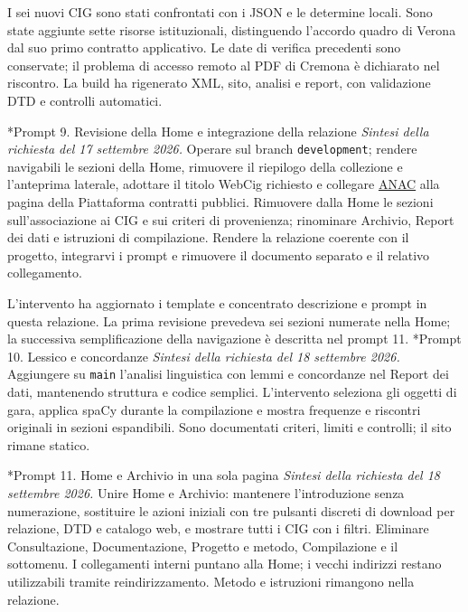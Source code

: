 \documentclass[10pt,a4paper]{article}
\makeatletter
\newcommand{\code}[1]{\texttt{#1}}
\newcommand{\anac}{\href{https://www.anticorruzione.it/-/piattaforma-contratti-pubblici}{ANAC}}
\renewcommand\subsection{\@startsection{subsection}{2}{0pt}{6pt}{2pt}{\normalsize\bfseries}}
\makeatother
\begin{document}
I sei nuovi CIG sono stati confrontati con i JSON e le determine locali. Sono state aggiunte sette risorse istituzionali, distinguendo l’accordo quadro di Verona dal suo primo contratto applicativo. Le date di verifica precedenti sono conservate; il problema di accesso remoto al PDF di Cremona è dichiarato nel riscontro. La build ha rigenerato XML, sito, analisi e report, con validazione DTD e controlli automatici.

\subsection*{Prompt 9. Revisione della Home e integrazione della relazione}
\emph{Sintesi della richiesta del 17 settembre 2026.} Operare sul branch \code{development}; rendere navigabili le sezioni della Home, rimuovere il riepilogo della collezione e l'anteprima laterale, adottare il titolo WebCig richiesto e collegare \anac{} alla pagina della Piattaforma contratti pubblici. Rimuovere dalla Home le sezioni sull'associazione ai CIG e sui criteri di provenienza; rinominare Archivio, Report dei dati e istruzioni di compilazione. Rendere la relazione coerente con il progetto, integrarvi i prompt e rimuovere il documento separato e il relativo collegamento.

L'intervento ha aggiornato i template e concentrato descrizione e prompt in questa relazione. La prima revisione prevedeva sei sezioni numerate nella Home; la successiva semplificazione della navigazione è descritta nel prompt 11.
\subsection*{Prompt 10. Lessico e concordanze}
\emph{Sintesi della richiesta del 18 settembre 2026.} Aggiungere su \code{main} l'analisi linguistica con lemmi e concordanze nel Report dei dati, mantenendo struttura e codice semplici. L'intervento seleziona gli oggetti di gara, applica spaCy durante la compilazione e mostra frequenze e riscontri originali in sezioni espandibili. Sono documentati criteri, limiti e controlli; il sito rimane statico.

\subsection*{Prompt 11. Home e Archivio in una sola pagina}
\emph{Sintesi della richiesta del 18 settembre 2026.} Unire Home e Archivio: mantenere l'introduzione senza numerazione, sostituire le azioni iniziali con tre pulsanti discreti di download per relazione, DTD e catalogo web, e mostrare tutti i CIG con i filtri. Eliminare Consultazione, Documentazione, Progetto e metodo, Compilazione e il sottomenu. I collegamenti interni puntano alla Home; i vecchi indirizzi restano utilizzabili tramite reindirizzamento. Metodo e istruzioni rimangono nella relazione.
\end{document}
